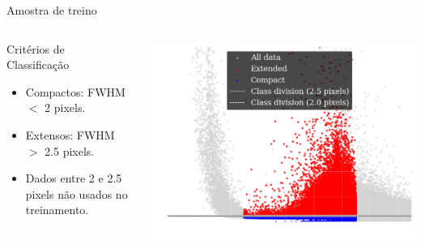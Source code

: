 \begin{frame}[c]{Amostra de treino}
    \begin{columns}[c]
        \begin{column}{0.3\textwidth}
            \begin{splusbox}{\scriptsize Critérios de Classificação}
                \scriptsize
                \begin{itemize}
                    \item Compactos: FWHM $<$ 2 pixels.
                    \item Extensos: FWHM $>$ 2.5 pixels.
                    \item Dados entre 2 e 2.5 pixels não usados no treinamento.
                \end{itemize}
            \end{splusbox}
        \end{column}
        \begin{column}{0.7\textwidth}
            \centering
            \includegraphics[width=\linewidth]{images/amostra_treino.png}
        \end{column}
    \end{columns}
\end{frame}

